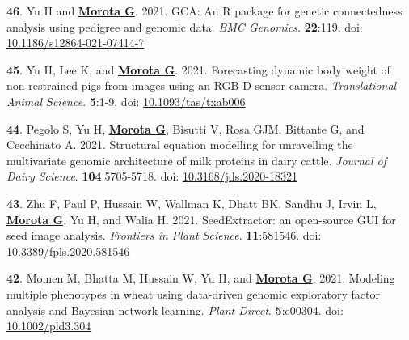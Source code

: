 \documentclass[margin,line,10pt]{res}
\newenvironment{list1}{
  \begin{list}{\ding{113}}{%
      \setlength{\itemsep}{0in}
      \setlength{\parsep}{0in} \setlength{\parskip}{0in}
      \setlength{\topsep}{0in} \setlength{\partopsep}{0in} 
      \setlength{\leftmargin}{0.17in}}}{\end{list}}
\begin{document}
\begin{resume}
\begin{list1}
  \vspace{0.5cm}

  \item  [{\bf 46}.] Yu H and \textbf{\underline{Morota G}}. 2021. GCA: An R package for genetic connectedness analysis using pedigree and genomic data. \emph{BMC Genomics}. \textbf{22}:119.  doi: \textcolor{blue}{\href{https://doi.org/10.1186/s12864-021-07414-7}{10.1186/s12864-021-07414-7}}

  \vspace{0.5cm}

  
\item [{\bf 45}.] Yu H, Lee K, and \textbf{\underline{Morota G}}. 2021. Forecasting dynamic body weight of non-restrained pigs from images using an RGB-D sensor camera. \emph{Translational Animal Science}. \textbf{5}:1-9. doi: \textcolor{blue}{\href{https://doi.org/10.1093/tas/txab006}{10.1093/tas/txab006}} 

  \vspace{0.5cm}
  
\item [{\bf 44}.] Pegolo S, Yu H, \textbf{\underline{Morota G}}, Bisutti V, Rosa GJM, Bittante G, and Cecchinato A. 2021. Structural equation modelling for unravelling the multivariate genomic architecture of milk proteins in dairy cattle. \emph{Journal of Dairy Science}. \textbf{104}:5705-5718.  doi: \textcolor{blue}{\href{https://doi.org/10.3168/jds.2020-18321}{10.3168/jds.2020-18321}} 

  \vspace{0.5cm}
  
  \item [{\bf 43}.] Zhu F, Paul P, Hussain W, Wallman K, Dhatt BK, Sandhu J, Irvin L, \textbf{\underline{Morota G}}, Yu H, and Walia H. 2021. SeedExtractor: an open-source GUI for seed image analysis. \emph{Frontiers in Plant Science}. \textbf{11}:581546. doi: \textcolor{blue}{\href{https://doi.org/10.3389/fpls.2020.581546}{10.3389/fpls.2020.581546}}

    \vspace{0.5cm}
    
\item [{\bf 42}.] Momen M, Bhatta M, Hussain W, Yu H, and \textbf{\underline{Morota G}}. 2021. Modeling multiple phenotypes in wheat using data-driven genomic exploratory factor analysis and Bayesian network learning. \emph{Plant Direct}. \textbf{5}:e00304. doi: \textcolor{blue}{\href{https://doi.org/10.1002/pld3.304}{10.1002/pld3.304}}

      \vspace{0.5cm}


\end{list1}
\end{resume}
\end{document}
